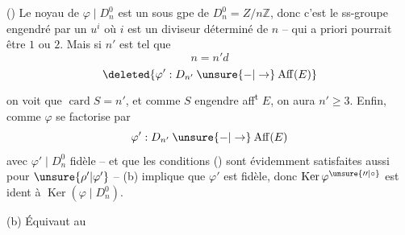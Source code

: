 ()  Le noyau de $\varphi\mid D_n^0$ est un sous gpe de $D_n^0=Z/n\mathbb Z$, donc  c'est le ss-groupe engendré par un $u^i$ où $i$ est un diviseur  déterminé de $n$ --  qui a priori pourrait être $1$ ou $2$. Mais si  $n'$ est tel que
\[
n=n'd
\]
\[
\deleted{\varphi':D_{n'}\mathbin{\unsure{-|\to}}\mathrm{Aff}(E)}
\]
on voit que  $\operatorname{card}S=n'$,  et comme $S$ engendre aff\textsuperscript{t} $E$, on aura $n'\geq3$. Enfin, comme $\varphi$ se factorise par
\[
\varphi':D_{n'}\mathbin{\unsure{-|\to}}\mathrm{Aff}(E)
\]
avec $\varphi'\mid D_n^0$ \unsure{$^{\bullet}$} fidèle -- et que les conditions () sont évidemment satisfaites aussi pour $\unsure{\rho'|\varphi'}$ -- (b) implique que $\varphi'$ est fidèle, donc $\operatorname{Ker}\varphi^{\unsure{\prime\prime|\circ}}$ est ident à $\operatorname{Ker}(\varphi\mid D_n^0)$.

(b)   Équivaut au
